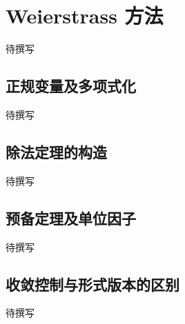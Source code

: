 
% 
% 

\section{Weierstrass 方法}
\label{g4:sec:1402}

待撰写

\subsection{正规变量及多项式化}
\label{g4:subsec:1402:01}
待撰写

\subsection{除法定理的构造}
\label{g4:subsec:1402:02}
待撰写

\subsection{预备定理及单位因子}
\label{g4:subsec:1402:03}
待撰写

\subsection{收敛控制与形式版本的区别}
\label{g4:subsec:1402:04}
待撰写
